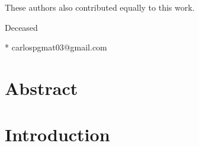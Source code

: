 \documentclass[10pt,letterpaper]{article} %
\begin{document}
\begin{flushleft}
		
		\ddag These authors also contributed equally to this work.
		
		
		\dag Deceased
		
		
		* carlospgmat03@gmail.com
		
	\end{flushleft}
	\section*{Abstract} %
	
	\linenumbers
	\section*{Introduction} %
	
	
\end{document}
